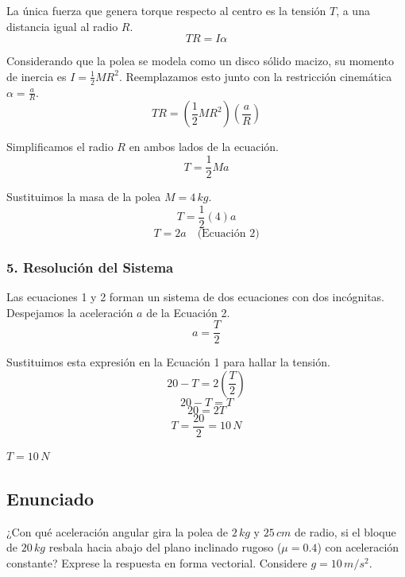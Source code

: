 \documentclass[12pt, a4paper]{article}
\begin{document}
La única fuerza que genera torque respecto al centro es la tensión $T$, a una distancia igual al radio $R$.
$$T R = I \alpha$$

Considerando que la polea se modela como un disco sólido macizo, su momento de inercia es $I = \frac{1}{2} M R^2$. Reemplazamos esto junto con la restricción cinemática $\alpha = \frac{a}{R}$.
$$T R = \left( \frac{1}{2} M R^2 \right) \left( \frac{a}{R} \right)$$

Simplificamos el radio $R$ en ambos lados de la ecuación.
$$T = \frac{1}{2} M a$$

Sustituimos la masa de la polea $M = 4 \, \si{kg}$.
$$T = \frac{1}{2} (4) a$$
$$T = 2 a \quad \text{(Ecuación 2)}$$

\subsubsection*{5. Resolución del Sistema}
Las ecuaciones 1 y 2 forman un sistema de dos ecuaciones con dos incógnitas. Despejamos la aceleración $a$ de la Ecuación 2.
$$a = \frac{T}{2}$$

Sustituimos esta expresión en la Ecuación 1 para hallar la tensión.
$$20 - T = 2 \left( \frac{T}{2} \right)$$
$$20 - T = T$$
$$20 = 2 T$$
$$T = \frac{20}{2} = 10 \, \si{N}$$

\begin{tcolorbox}[colback=green!5!white, colframe=green!50!black, title=Respuesta Final]
\centering \Large $T = 10 \, \si{N}$
\end{tcolorbox}

\newpage

\subsection*{Enunciado}
¿Con qué aceleración angular gira la polea de $2 \, \si{kg}$ y $25 \, \si{cm}$ de radio, si el bloque de $20 \, \si{kg}$ resbala hacia abajo del plano inclinado rugoso ($\mu = 0.4$) con aceleración constante? Exprese la respuesta en forma vectorial. Considere $g = 10 \, \si{m/s^2}$.
\end{document}
